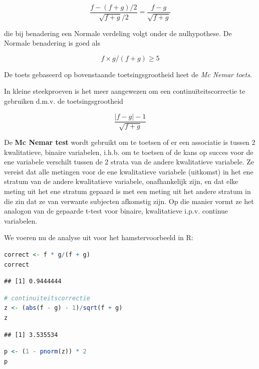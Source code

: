 \documentclass[
  12pt,dutch,coursenotes]{book}
\begin{document}
\begin{equation*}
\frac{f-(f+g)/2}{\sqrt{f+g}/2}=\frac{f-g}{\sqrt{f+g}}
\end{equation*}

die bij benadering een Normale verdeling volgt onder de nulhypothese.
De Normale benadering is goed als

\[f \times g/(f+g) \geq 5\]

De toets gebaseerd op bovenstaande toetsingsgrootheid heet de \emph{Mc Nemar toets}.

In kleine steekproeven is het meer aangewezen om een continuïteitscorrectie te gebruiken d.m.v. de toetsingsgrootheid

\begin{equation*}
\frac{|f-g|-1}{\sqrt{f+g}}
\end{equation*}

De \textbf{Mc Nemar test} wordt gebruikt om te toetsen of er een associatie is tussen 2 kwalitatieve, binaire variabelen, i.h.b. om te toetsen of de kans op succes voor de ene variabele verschilt tussen de 2 strata van de andere kwalitatieve variabele. Ze vereist dat alle metingen voor de ene kwalitatieve variabele (uitkomst) in het ene stratum van de andere kwalitatieve variabele, onafhankelijk zijn, en dat elke meting uit het ene stratum gepaard is met een meting uit het andere stratum in die zin dat ze van verwante subjecten afkomstig zijn. Op die manier vormt ze het analogon van de gepaarde t-test voor binaire, kwalitatieve i.p.v. continue variabelen.

We voeren nu de analyse uit voor het hamstervoorbeeld in R:

\begin{lstlisting}[language=R]
correct <- f * g/(f + g)
correct
\end{lstlisting}

\begin{lstlisting}
## [1] 0.9444444
\end{lstlisting}

\begin{lstlisting}[language=R]
# continuiteitscorrectie
z <- (abs(f - g) - 1)/sqrt(f + g)
z
\end{lstlisting}

\begin{lstlisting}
## [1] 3.535534
\end{lstlisting}

\begin{lstlisting}[language=R]
p <- (1 - pnorm(z)) * 2
p
\end{lstlisting}
\end{document}
